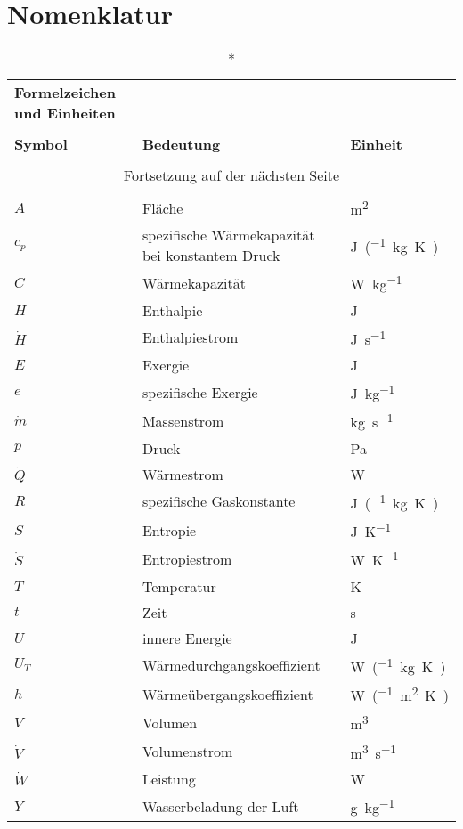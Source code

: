 \chapter*{Nomenklatur}
\begin{onehalfspacing}
\begin{longtable}[h]{p{} p{} p{}}
		\caption*{\textbf{Formelzeichen und Einheiten}} \\
		\\
		\textbf{Symbol} & \textbf{Bedeutung} & \textbf{Einheit} \\ %
		\endhead
		\\
		\multicolumn{3}{c}{Fortsetzung auf der nächsten Seite} \\
		\endfoot
		\multicolumn{3}{c}{ } \\
		\endlastfoot
		
		$A$ 		& Fläche 											& \si{\m^{2}}\\
		$c_{p}$		& spezifische Wärmekapazität bei konstantem Druck	& \si{\joule\per(\kilogram\kelvin)}\\
		$C$			& Wärmekapazität									& \si{\watt\per\kilogram}\\
		$H $ 		& Enthalpie 										& \si{\joule}\\		
		$\dot{H}$ 	& Enthalpiestrom 									& \si{\joule\per\second}\\
		$E$ 		& Exergie 											& \si{\joule}\\
		$e$ 		& spezifische Exergie 								& \si{\joule\per\kilogram}\\
		$\dot{m}$ 	& Massenstrom 										& \si{\kilogram\per\second}\\
		$p$ 		& Druck 											& \si{\pascal}\\
		$\dot{Q}$ 	& Wärmestrom 										& \si{\watt}\\
		$R$ 		& spezifische Gaskonstante 							& \si{\joule\per(\kilogram\kelvin)}\\
		$S$ 		& Entropie 											& \si{\joule\per\kelvin}\\
		$\dot{S}$ 	& Entropiestrom 									& \si{\watt\per\kelvin}\\
		$T$ 		& Temperatur 										& \si{\kelvin}\\
		$t$ 		& Zeit 												& \si{\second}\\
		$U$ 		& innere Energie 									& \si{\joule}\\
		$U_{T}$ 	& Wärmedurchgangskoeffizient 						& \si{\watt\per(\kilogram\kelvin)}\\
		$h$ 		& Wärmeübergangskoeffizient 						& \si{\watt\per(\m^{2}\kelvin)}\\		
		$V$ 		& Volumen 											& \si{\meter^{3}}\\
		$\dot{V}$	& Volumenstrom										& \si{\m^3\per\second}\\
		$\dot{W}$ 	& Leistung 											& \si{\watt}\\
		$Y$ 		& Wasserbeladung der Luft 							& \si{\gram\per\kilogram}\\
		

\end{longtable}
\end{onehalfspacing}

